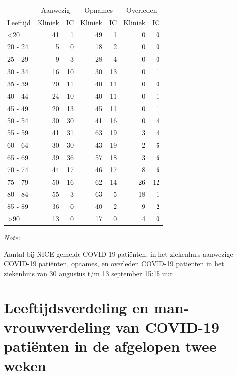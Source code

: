\documentclass[
  english,
  man,floatsintext]{apa6}
\begin{document}
\begin{table}
\centering\begingroup\fontsize{10}{12}\selectfont

\begin{threeparttable}
\begin{tabular}{lrrrrrr}
\toprule
\multicolumn{1}{c}{ } & \multicolumn{2}{c}{Aanwezig} & \multicolumn{2}{c}{Opnames} & \multicolumn{2}{c}{Overleden} \\
\cmidrule(l{3pt}r{3pt}){2-3} \cmidrule(l{3pt}r{3pt}){4-5} \cmidrule(l{3pt}r{3pt}){6-7}
Leeftijd & Kliniek & IC & Kliniek & IC & Kliniek & IC\\
\midrule
<20 & 41 & 1 & 49 & 1 & 0 & 0\\
20 - 24 & 5 & 0 & 18 & 2 & 0 & 0\\
25 - 29 & 9 & 3 & 28 & 4 & 0 & 0\\
30 - 34 & 16 & 10 & 30 & 13 & 0 & 1\\
35 - 39 & 20 & 11 & 40 & 11 & 0 & 0\\
40 - 44 & 24 & 10 & 40 & 11 & 0 & 1\\
45 - 49 & 20 & 13 & 45 & 11 & 0 & 1\\
50 - 54 & 30 & 30 & 41 & 16 & 0 & 4\\
55 - 59 & 41 & 31 & 63 & 19 & 3 & 4\\
60 - 64 & 30 & 30 & 43 & 19 & 2 & 6\\
65 - 69 & 39 & 36 & 57 & 18 & 3 & 6\\
70 - 74 & 44 & 17 & 46 & 17 & 8 & 6\\
75 - 79 & 50 & 16 & 62 & 14 & 26 & 12\\
80 - 84 & 55 & 3 & 63 & 5 & 18 & 1\\
85 - 89 & 36 & 0 & 40 & 2 & 9 & 2\\
>90 & 13 & 0 & 17 & 0 & 4 & 0\\
\bottomrule
\end{tabular}
\begin{tablenotes}
\item \textit{Note: } 
\item Aantal bij NICE gemelde COVID-19 patiënten: in het ziekenhuis aanwezige COVID-19 patiënten, opnames, en overleden COVID-19 patiënten in het ziekenhuis van 30 augustus t/m 13 september 15:15 uur
\end{tablenotes}
\end{threeparttable}
\endgroup{}
\end{table}

\newpage

\hypertarget{leeftijdsverdeling-en-man-vrouwverdeling-van-covid-19-patiuxebnten-in-de-afgelopen-twee-weken}{%
\section{Leeftijdsverdeling en man-vrouwverdeling van COVID-19 patiënten in de afgelopen twee weken}\label{leeftijdsverdeling-en-man-vrouwverdeling-van-covid-19-patiuxebnten-in-de-afgelopen-twee-weken}}
\end{document}
